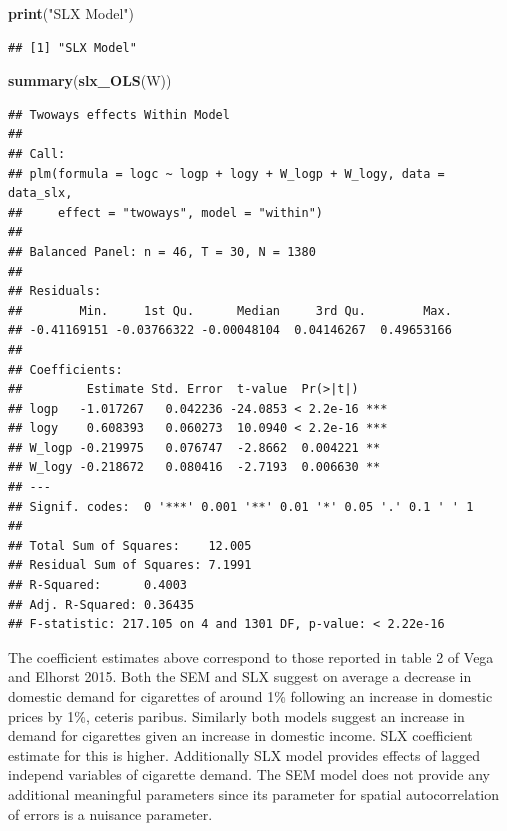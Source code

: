 \documentclass[
  a4paper,
]{article}
\newenvironment{Shaded}{\begin{snugshade}}{\end{snugshade}}
\newcommand{\FunctionTok}[1]{\textcolor[rgb]{0.13,0.29,0.53}{\textbf{#1}}}
\newcommand{\NormalTok}[1]{#1}
\newcommand{\StringTok}[1]{\textcolor[rgb]{0.31,0.60,0.02}{#1}}
\begin{document}
\begin{Shaded}
\begin{Highlighting}[]
\FunctionTok{print}\NormalTok{(}\StringTok{"SLX Model"}\NormalTok{)}
\end{Highlighting}
\end{Shaded}

\begin{verbatim}
## [1] "SLX Model"
\end{verbatim}

\begin{Shaded}
\begin{Highlighting}[]
\FunctionTok{summary}\NormalTok{(}\FunctionTok{slx\_OLS}\NormalTok{(W))}
\end{Highlighting}
\end{Shaded}

\begin{verbatim}
## Twoways effects Within Model
## 
## Call:
## plm(formula = logc ~ logp + logy + W_logp + W_logy, data = data_slx, 
##     effect = "twoways", model = "within")
## 
## Balanced Panel: n = 46, T = 30, N = 1380
## 
## Residuals:
##        Min.     1st Qu.      Median     3rd Qu.        Max. 
## -0.41169151 -0.03766322 -0.00048104  0.04146267  0.49653166 
## 
## Coefficients:
##         Estimate Std. Error  t-value  Pr(>|t|)    
## logp   -1.017267   0.042236 -24.0853 < 2.2e-16 ***
## logy    0.608393   0.060273  10.0940 < 2.2e-16 ***
## W_logp -0.219975   0.076747  -2.8662  0.004221 ** 
## W_logy -0.218672   0.080416  -2.7193  0.006630 ** 
## ---
## Signif. codes:  0 '***' 0.001 '**' 0.01 '*' 0.05 '.' 0.1 ' ' 1
## 
## Total Sum of Squares:    12.005
## Residual Sum of Squares: 7.1991
## R-Squared:      0.4003
## Adj. R-Squared: 0.36435
## F-statistic: 217.105 on 4 and 1301 DF, p-value: < 2.22e-16
\end{verbatim}

The coefficient estimates above correspond to those reported in table 2
of Vega and Elhorst 2015. Both the SEM and SLX suggest on average a
decrease in domestic demand for cigarettes of around 1\% following an
increase in domestic prices by 1\%, ceteris paribus. Similarly both
models suggest an increase in demand for cigarettes given an increase in
domestic income. SLX coefficient estimate for this is higher.
Additionally SLX model provides effects of lagged independ variables of
cigarette demand. The SEM model does not provide any additional
meaningful parameters since its parameter for spatial autocorrelation of
errors is a nuisance parameter.
\end{document}
